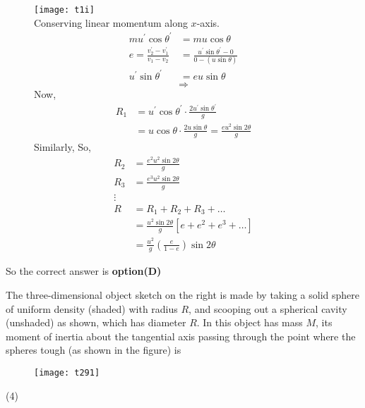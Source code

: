 \begin{questions}
\begin{tasks}
\end{tasks}
\begin{answer}
	\begin{figure}[H]
		\centering
		\texttt{[image: t1i]}\\
	Conserving linear momentum along $x$-axis.
	$$
	\begin{aligned}
	m u^{\prime} \cos \theta^{\prime} &=m u \cos \theta \\
	e=\frac{v_{2}^{\prime}-v_{1}^{\prime}}{v_{1}-v_{2}} &=\frac{u^{\prime} \sin \theta^{\prime}-0}{0-(u \sin \theta)} \\
	u^{\prime} \sin \theta^{\prime} &=e u \sin \theta
	\end{aligned}
	$$
	$$
	\Rightarrow
	$$
	Now,
	$$
	\begin{aligned}
	R_{1} &=u^{\prime} \cos \theta^{\prime} \cdot \frac{2 u^{\prime} \sin \theta^{\prime}}{g} \\
	&=u \cos \theta \cdot \frac{2 u \sin \theta}{g}=\frac{e u^{2} \sin 2 \theta}{g}
	\end{aligned}
	$$
	Similarly,
	So,
	$$
	\begin{aligned}
	R_{2} &=\frac{e^{2} u^{2} \sin 2 \theta}{g} \\
	R_{3} &=\frac{e^{3} u^{2} \sin 2 \theta}{g} \\
	\vdots & \\
	R &=R_{1}+R_{2}+R_{3}+\ldots \\
	&=\frac{u^{2} \sin 2 \theta}{g}\left[e+e^{2}+e^{3}+\ldots\right] \\
	&=\frac{u^{2}}{g}\left(\frac{e}{1-e}\right) \sin 2 \theta
	\end{aligned}
	$$
	\end{figure}
	So the correct answer is \textbf{option(D)}
\end{answer}
\begin{minipage}{\textwidth}
	\question The three-dimensional object sketch on the right is made by taking a solid sphere of uniform density (shaded) with radius $R$, and scooping out a spherical cavity (unshaded) as shown, which has diameter $R$.
	In this object has mass $M$, its moment of inertia about the tangential axis passing through the point where the spheres tough (as shown in the figure) is
\end{minipage}
\begin{figure}[H]
	\centering
	\texttt{[image: t291]}
\end{figure}
\begin{tasks}(4)

\end{tasks}
\end{questions}

